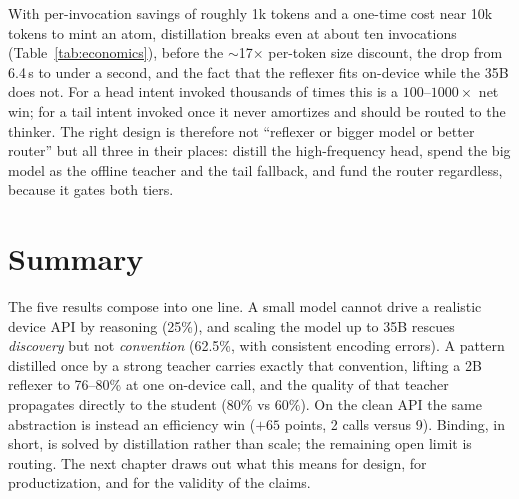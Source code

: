 With per-invocation savings of roughly 1k tokens and a one-time cost near 10k
tokens to mint an atom, distillation breaks even at about ten invocations
(Table~\ref{tab:economics}), before the $\sim$17$\times$ per-token size discount,
the drop from 6.4\,s to under a second, and the fact that the reflexer fits
on-device while the 35B does not. For a head intent invoked thousands of times
this is a $100$--$1000\times$ net win; for a tail intent invoked once it never
amortizes and should be routed to the thinker. The right design is therefore not
``reflexer or bigger model or better router'' but all three in their places:
distill the high-frequency head, spend the big model as the offline teacher and
the tail fallback, and fund the router regardless, because it gates both tiers.

\section{Summary}
\label{sec:eval-summary}

The five results compose into one line. A small model cannot drive a realistic
device API by reasoning (25\%), and scaling the model up to 35B rescues
\emph{discovery} but not \emph{convention} (62.5\%, with consistent
encoding errors). A pattern distilled once by a strong teacher carries exactly
that convention, lifting a 2B reflexer to 76--80\% at one on-device call, and the
quality of that teacher propagates directly to the student ($80\%$ vs $60\%$). On
the clean API the same abstraction is instead an efficiency win
($+65$ points, 2 calls versus 9). Binding, in short, is solved by distillation
rather than scale; the remaining open limit is routing. The next chapter draws
out what this means for design, for productization, and for the validity of the
claims.
